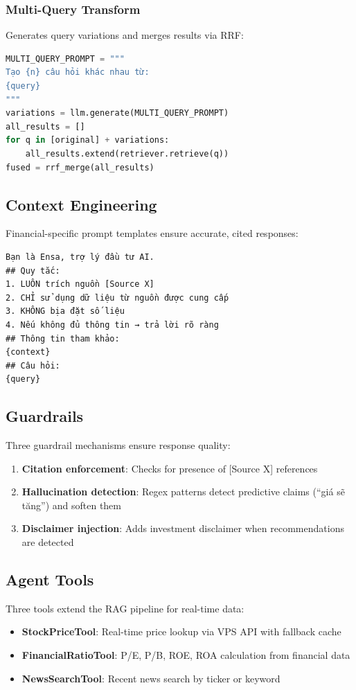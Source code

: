\documentclass[12pt,a4paper]{article}
\begin{document}
\subsubsection{Multi-Query Transform}
Generates query variations and merges results via RRF:
\begin{lstlisting}[language=Python]
MULTI_QUERY_PROMPT = """
Tạo {n} câu hỏi khác nhau từ:
{query}
"""
variations = llm.generate(MULTI_QUERY_PROMPT)
all_results = []
for q in [original] + variations:
    all_results.extend(retriever.retrieve(q))
fused = rrf_merge(all_results)
\end{lstlisting}

\subsection{Context Engineering}

Financial-specific prompt templates ensure accurate, cited responses:

\begin{lstlisting}[caption={Financial QA prompt template}, basicstyle=\ttfamily\tiny]
Bạn là Ensa, trợ lý đầu tư AI.
## Quy tắc:
1. LUÔN trích nguồn [Source X]
2. CHỈ sử dụng dữ liệu từ nguồn được cung cấp
3. KHÔNG bịa đặt số liệu
4. Nếu không đủ thông tin → trả lời rõ ràng
## Thông tin tham khảo:
{context}
## Câu hỏi:
{query}
\end{lstlisting}

\subsection{Guardrails}

Three guardrail mechanisms ensure response quality:
\begin{enumerate}
    \item \textbf{Citation enforcement}: Checks for presence of [Source X]
    references
    \item \textbf{Hallucination detection}: Regex patterns detect predictive
    claims (``giá sẽ tăng'') and soften them
    \item \textbf{Disclaimer injection}: Adds investment disclaimer when
    recommendations are detected
\end{enumerate}

\subsection{Agent Tools}

Three tools extend the RAG pipeline for real-time data:
\begin{itemize}
    \item \textbf{StockPriceTool}: Real-time price lookup via VPS API with
    fallback cache
    \item \textbf{FinancialRatioTool}: P/E, P/B, ROE, ROA calculation from
    financial data
    \item \textbf{NewsSearchTool}: Recent news search by ticker or keyword
\end{itemize}
\end{document}
